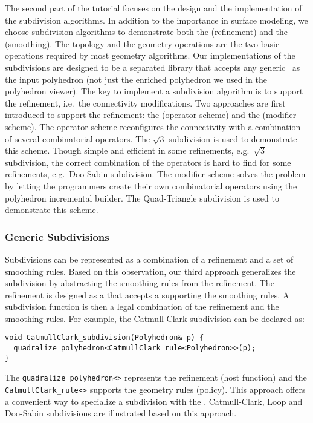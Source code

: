 \documentclass[letter,twocolumn]{article}
\begin{document}
The second part of the tutorial focuses on the design and the
implementation of the subdivision algorithms.  In addition to the
importance in surface modeling, we choose subdivision algorithms to
demonstrate both the  (refinement) and the
 (smoothing). The topology and the geometry
operations are the two basic operations required by most geometry
algorithms. Our implementations of the subdivisions are designed to be
a separated library that accepts any generic \poly\ as the input
polyhedron (not just the enriched polyhedron we used in the polyhedron
viewer). The key to implement a subdivision algorithm is to support
the refinement, i.e.\ the connectivity modifications.  Two approaches
are first introduced to support the refinement: the  (operator scheme) and
the  (modifier scheme).  The operator
scheme reconfigures the connectivity with a combination of several
combinatorial operators. The $\sqrt{3}$ subdivision is used to
demonstrate this scheme. Though simple and efficient in some
refinements, e.g.\ $\sqrt{3}$ subdivision, the correct combination of
the operators is hard to find for some refinements, e.g.\ Doo-Sabin
subdivision. The modifier scheme solves the problem by letting the
programmers create their own combinatorial operators using the
polyhedron incremental builder.  The Quad-Triangle subdivision is used
to demonstrate this scheme.

\subsubsection*{Generic Subdivisions}

Subdivisions can be represented as a combination of a refinement and a
set of smoothing rules. Based on this observation, our third approach
generalizes the subdivision by abstracting the smoothing rules from
the refinement. The refinement is designed as a 
that accepts a  supporting the smoothing rules. A
subdivision function is then a legal combination of the refinement and
the smoothing rules.  For example, the Catmull-Clark subdivision can
be declared as:
\begin{lstlisting}
void CatmullClark_subdivision(Polyhedron& p) {    
  quadralize_polyhedron<CatmullClark_rule<Polyhedron>>(p);  
}
\end{lstlisting}

The \lstinline!quadralize_polyhedron<>! represents the refinement
(host function) and the \lstinline!CatmullClark_rule<>! supports the
geometry rules (policy).  This approach offers a convenient way to
specialize a subdivision with the .
Catmull-Clark, Loop and Doo-Sabin subdivisions are illustrated based
on this approach.
\end{document}
